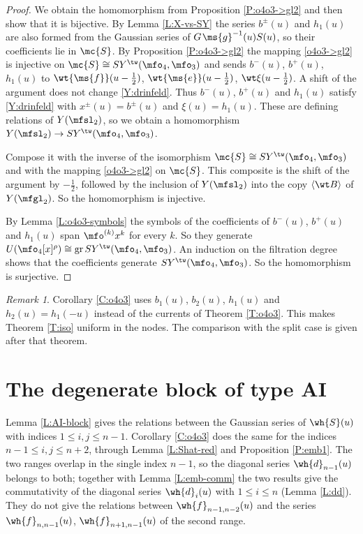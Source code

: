 \documentclass{amsart}
\numberwithin{equation}{section}
\theoremstyle{remark}
\newtheorem{remark}[theorem]{Remark}
\DeclareMathOperator{\gr}{gr}
\renewcommand{\,}{\kern 0.1em} %
\begin{document}
\begin{proof}
%
We obtain the homomorphism from Proposition \ref{P:o4o3->gl2} and then show that it is bijective.
By Lemma \ref{L:X-vs-SY} the series $b^\pm(u)$ and $h_1(u)$ are also formed from the Gaussian
series of $G\,\ms{g}^{-1}(u)S(u)$, so their coefficients lie in $\mc{S}$. By Proposition
\ref{P:o4o3->gl2} the mapping \eqref{o4o3->gl2} is injective on
$\mc{S}\cong SY^\tw(\mfo_4,\mfo_3)$ and sends $b^-(u)$, $b^+(u)$, $h_1(u)$ to
$\wt{\ms{f}}(u-\tfrac12)$, $\wt{\ms{e}}(u-\tfrac12)$, $\wt\xi(u-\tfrac12)$. A shift of the argument
does not change \eqref{Y:drinfeld}. Thus $b^-(u)$, $b^+(u)$ and $h_1(u)$ satisfy \eqref{Y:drinfeld}
with $x^\pm(u)=b^\pm(u)$ and $\xi(u)=h_1(u)$. These are defining relations of $Y(\mfsl_2)$, so we
obtain a homomorphism $Y(\mfsl_2)\to SY^\tw(\mfo_4,\mfo_3)$.

Compose it with the inverse of the isomorphism $\mc{S}\cong SY^\tw(\mfo_4,\mfo_3)$ and with the
mapping \eqref{o4o3->gl2} on $\mc{S}$. This composite is the shift of the argument by $-\tfrac12$,
followed by the inclusion of $Y(\mfsl_2)$ into the copy $\langle\wt B\rangle$ of $Y(\mfgl_2)$. So
the homomorphism is injective.

By Lemma \ref{L:o4o3-symbols} the symbols of the coefficients of $b^-(u)$, $b^+(u)$ and $h_1(u)$
span $\mfo^{(k)}x^k$ for every $k$. So they generate
$U(\mfo_4[x]^\rho)\cong\gr SY^\tw(\mfo_4,\mfo_3)$. An induction on the filtration degree shows that
the coefficients generate $SY^\tw(\mfo_4,\mfo_3)$. So the homomorphism is surjective.
%
\end{proof}

\begin{remark} \label{R:o4o3-vs-split}
%
Corollary \ref{C:o4o3} uses $b_1(u)$, $b_2(u)$, $h_1(u)$ and $h_2(u)=h_1(-u)$ instead of the
currents of Theorem \ref{T:o4o3}. This makes Theorem \ref{T:iso} uniform in the nodes. The comparison
with the split case is given after that theorem.
%
\end{remark}




\section{The degenerate block of type AI} \label{sec:deg}

Lemma \ref{L:AI-block} gives the relations between the Gaussian series of $\wh{S}(u)$ with
indices $1\le i,j\le n-1$. Corollary \ref{C:o4o3} does the same for the indices
$n-1\le i,j\le n+2$, through Lemma \ref{L:Shat-red} and Proposition \ref{P:emb1}. The two ranges
overlap in the single index $n-1$, so the diagonal series $\wh{d}_{n-1}(u)$ belongs to both;
together with Lemma \ref{L:emb-comm} the two results give the commutativity of the diagonal
series $\wh{d}_i(u)$ with $1\le i\le n$ (Lemma \ref{L:dd}). They do not give the relations
between $\wh{f}_{n-1,n-2}(u)$ and the series $\wh{f}_{n,n-1}(u)$, $\wh{f}_{n+1,n-1}(u)$ of the second
range.
\end{document}
